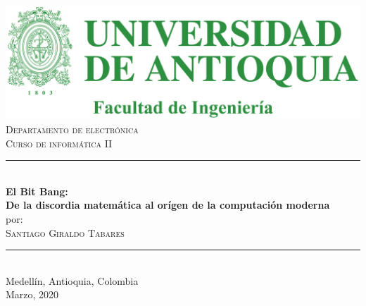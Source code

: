 \documentclass[12pt]{article}
\begin{document}
\begin{titlepage}
\BgThispage
\newcommand{\HRule}{\rule{\linewidth}{0.5mm}}
\center
\includegraphics[scale=0.4]{Escudo.jpg}\\[0.5 cm]
\textsc{\large Departamento de electrónica}\\[0.5cm]
\textsc{\large Curso de informática II}\\[0.5cm] 
\HRule \\[0.4cm]
{ \huge \bfseries El Bit Bang: \\[0.5 cm]\LARGE De la discordia matemática al orígen de la computación moderna}\\[0.4cm]
\large{por: }\\[0.3cm]
\textsc{Santiago Giraldo Tabares}\\
\HRule \\[1.5cm]
{\LARGE{Medellín, Antioquia, Colombia\\[0.2 cm]Marzo, 2020}}\\
\vfill
\end{titlepage}
\end{document}
